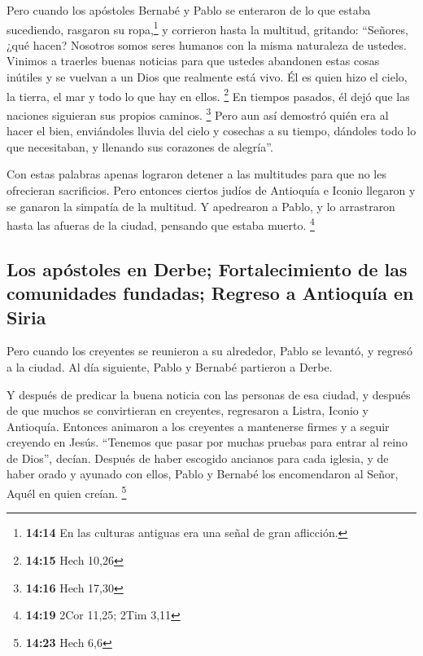  Pero cuando los apóstoles Bernabé y Pablo se enteraron
de lo que estaba sucediendo, rasgaron su ropa,\footnote{\textbf{14:14}
  En las culturas antiguas era una señal de gran aflicción.} y corrieron
hasta la multitud, gritando:  ``Señores, ¿qué hacen?
Nosotros somos seres humanos con la misma naturaleza de ustedes. Vinimos
a traerles buenas noticias para que ustedes abandonen estas cosas
inútiles y se vuelvan a un Dios que realmente está vivo. Él es quien
hizo el cielo, la tierra, el mar y todo lo que hay en ellos. \footnote{\textbf{14:15}
  Hech 10,26}  En tiempos pasados, él dejó que las
naciones siguieran sus propios caminos. \footnote{\textbf{14:16} Hech
  17,30}  Pero aun así demostró quién era al hacer el
bien, enviándoles lluvia del cielo y cosechas a su tiempo, dándoles todo
lo que necesitaban, y llenando sus corazones de alegría''.

 Con estas palabras apenas lograron detener a las
multitudes para que no les ofrecieran sacrificios.  Pero
entonces ciertos judíos de Antioquía e Iconio llegaron y se ganaron la
simpatía de la multitud. Y apedrearon a Pablo, y lo arrastraron hasta
las afueras de la ciudad, pensando que estaba muerto. \footnote{\textbf{14:19}
  2Cor 11,25; 2Tim 3,11}

\hypertarget{los-apuxf3stoles-en-derbe-fortalecimiento-de-las-comunidades-fundadas-regreso-a-antioquuxeda-en-siria}{%
\subsection{Los apóstoles en Derbe; Fortalecimiento de las comunidades
fundadas; Regreso a Antioquía en
Siria}\label{los-apuxf3stoles-en-derbe-fortalecimiento-de-las-comunidades-fundadas-regreso-a-antioquuxeda-en-siria}}

 Pero cuando los creyentes se reunieron a su alrededor,
Pablo se levantó, y regresó a la ciudad. Al día siguiente, Pablo y
Bernabé partieron a Derbe.

 Y después de predicar la buena noticia con las personas
de esa ciudad, y después de que muchos se convirtieran en creyentes,
regresaron a Listra, Iconio y Antioquía.  Entonces
animaron a los creyentes a mantenerse firmes y a seguir creyendo en
Jesús. ``Tenemos que pasar por muchas pruebas para entrar al reino de
Dios'', decían.  Después de haber escogido ancianos para
cada iglesia, y de haber orado y ayunado con ellos, Pablo y Bernabé los
encomendaron al Señor, Aquél en quien creían. \footnote{\textbf{14:23}
  Hech 6,6}

